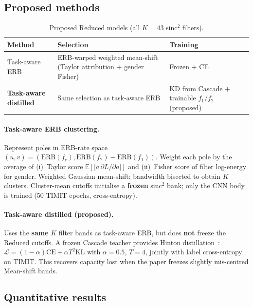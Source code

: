 \documentclass[11pt,a4paper]{article}
\begin{document}
\subsection{Proposed methods}

\begin{table}[H]
\centering
\caption{Proposed Reduced models (all $K{=}43$ sinc$^2$ filters).}
\label{tab:variants}
\begin{tabular}{@{}llp{6.8cm}@{}}
\toprule
\textbf{Method} & \textbf{Selection} & \textbf{Training} \\
\midrule
Task-aware ERB & ERB-warped weighted mean-shift (Taylor attribution + gender Fisher) & Frozen + CE \\
\textbf{Task-aware distilled} & Same selection as task-aware ERB & KD from Cascade + trainable $f_1/f_2$ (proposed) \\
\bottomrule
\end{tabular}
\end{table}

\paragraph{Task-aware ERB clustering.}
Represent poles in ERB-rate space $(u,v)=(\mathrm{ERB}(f_c),\mathrm{ERB}(f_2)-\mathrm{ERB}(f_1))$. Weight each pole by the average of (i)~Taylor score $\mathbb{E}[|a\,\partial L/\partial a|]$ and (ii)~Fisher score of filter log-energy for gender. Weighted Gaussian mean-shift; bandwidth bisected to obtain $K$ clusters. Cluster-mean cutoffs initialise a \textbf{frozen} sinc$^2$ bank; only the CNN body is trained (50 TIMIT epochs, cross-entropy).

\paragraph{Task-aware distilled (proposed).}
Uses the \textbf{same} $K$ filter bands as task-aware ERB, but does \textbf{not} freeze the Reduced cutoffs. A frozen Cascade teacher provides Hinton distillation~\cite{hinton2015}:
$\mathcal{L}=(1-\alpha)\mathrm{CE}+\alpha T^2\mathrm{KL}$ with $\alpha{=}0.5$, $T{=}4$, jointly with label cross-entropy on TIMIT. This recovers capacity lost when the paper freezes slightly mis-centred Mean-shift bands.

\subsection{Quantitative results}
\end{document}
